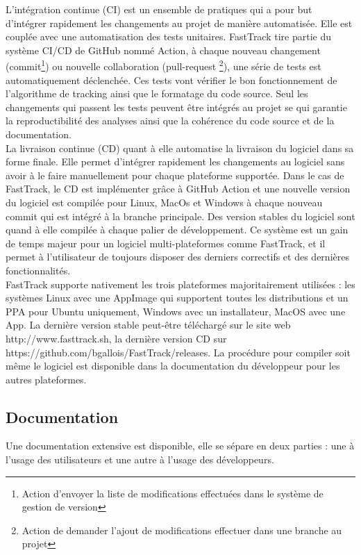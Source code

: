 		L'intégration continue (CI) est un ensemble de pratiques qui a pour but d'intégrer rapidement les changements au projet de manière automatisée. Elle est couplée avec une automatisation des tests unitaires. FastTrack tire partie du système CI/CD de GitHub nommé Action, à chaque nouveau changement (commit\footnote{Action d'envoyer la liste de modifications effectuées dans le système de gestion de version}) ou nouvelle collaboration (pull-request \footnote{Action de demander l'ajout de modifications effectuer dans une branche au projet}), une série de tests est automatiquement déclenchée. Ces tests vont vérifier le bon fonctionnement de l'algorithme de tracking ainsi que le formatage du code source. Seul les changements qui passent les tests peuvent être intégrés au projet se qui garantie la reproductibilité des analyses ainsi que la cohérence du code source et de la documentation.\\
		
		La livraison continue (CD) quant à elle automatise la livraison du logiciel dans sa forme finale. Elle permet d'intégrer rapidement les changements au logiciel sans avoir à le faire manuellement pour chaque plateforme supportée. Dans le cas de FastTrack, le CD est implémenter grâce à GitHub Action et une nouvelle version du logiciel est compilée pour Linux, MacOs et Windows à chaque nouveau commit qui est intégré à la branche principale. Des version stables du logiciel sont quand à elle compilée à chaque palier de développement. Ce système est un gain de temps majeur pour un logiciel multi-plateformes comme FastTrack, et il permet à l'utilisateur de toujours disposer des derniers correctifs et des dernières fonctionnalités.\\
		
		FastTrack supporte nativement les trois plateformes majoritairement utilisées : les systèmes Linux avec une AppImage qui supportent toutes les distributions et un PPA pour Ubuntu uniquement, Windows avec un installateur, MacOS avec une App. La dernière version stable peut-être téléchargé sur le site web http://www.fasttrack.sh, la dernière version CD sur https://github.com/bgallois/FastTrack/releases. La procédure pour compiler soit même le logiciel est disponible dans la documentation du développeur pour les autres plateformes.
		
		\subsection{Documentation}
		Une documentation extensive est disponible, elle se sépare en deux parties : une à l'usage des utilisateurs et une autre à l'usage des développeurs.
		
